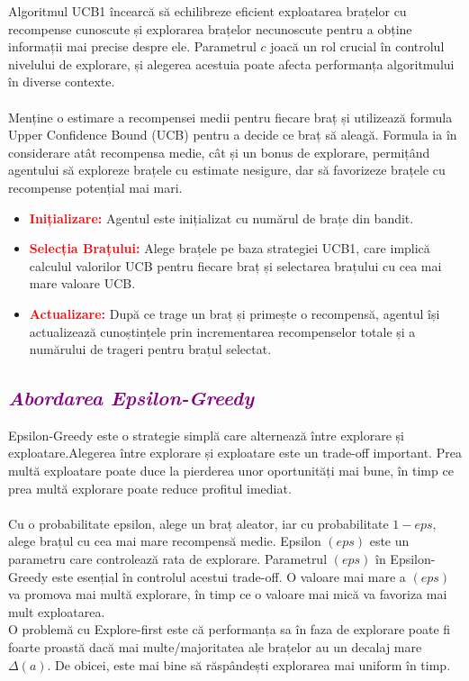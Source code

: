 \documentclass{article}
\begin{document}
Algoritmul UCB1 încearcă să echilibreze eficient exploatarea brațelor cu recompense cunoscute și explorarea brațelor necunoscute pentru a obține informații mai precise despre ele. Parametrul $c$ joacă un rol crucial în controlul nivelului de explorare, și alegerea acestuia poate afecta performanța algoritmului în diverse contexte.\\\\
Menține o estimare a recompensei medii pentru fiecare braț și utilizează formula Upper Confidence Bound (UCB) pentru a decide ce braț să aleagă. Formula ia în considerare atât recompensa medie, cât și un bonus de explorare, permițând agentului să exploreze brațele cu estimate nesigure, dar să favorizeze brațele cu recompense potențial mai mari.
    \begin{itemize}
         \item\textbf{\textcolor{red}{Inițializare:}} Agentul este inițializat cu numărul de brațe din bandit.
         \item\textbf{\textcolor{red}{Selecția Brațului:}} Alege brațele pe baza strategiei UCB1, care implică calculul valorilor UCB pentru fiecare braț și selectarea brațului cu cea mai mare valoare UCB.
         \item\textbf{\textcolor{red}{Actualizare:}} După ce trage un braț și primește o recompensă, agentul își actualizează cunoștințele prin incrementarea recompenselor totale și a numărului de trageri pentru brațul selectat.
    \end{itemize}
\textcolor{purple}{\subsection{\itshape \textcolor{purple}{Abordarea Epsilon-Greedy}}}
Epsilon-Greedy este o strategie simplă care alternează între explorare și exploatare.Alegerea între explorare și exploatare este un trade-off important. Prea multă exploatare poate duce la pierderea unor oportunități mai bune, în timp ce prea multă explorare poate reduce profitul imediat.\\\\
Cu o probabilitate epsilon, alege un braț aleator, iar cu probabilitate $1 - eps$, alege brațul cu cea mai mare recompensă medie. Epsilon $(eps)$ este un parametru care controlează rata de explorare.
Parametrul $(eps)$ în Epsilon-Greedy este esențial în controlul acestui trade-off. O valoare mai mare a $(eps)$ va promova mai multă explorare, în timp ce o valoare mai mică va favoriza mai mult exploatarea.\\
O problemă cu Explore-first este că performanța sa în faza de explorare poate fi foarte proastă dacă mai multe/majoritatea ale brațelor au un decalaj mare $\Delta (a)$. De obicei, este mai bine să răspândești explorarea mai uniform în timp.
\end{document}
